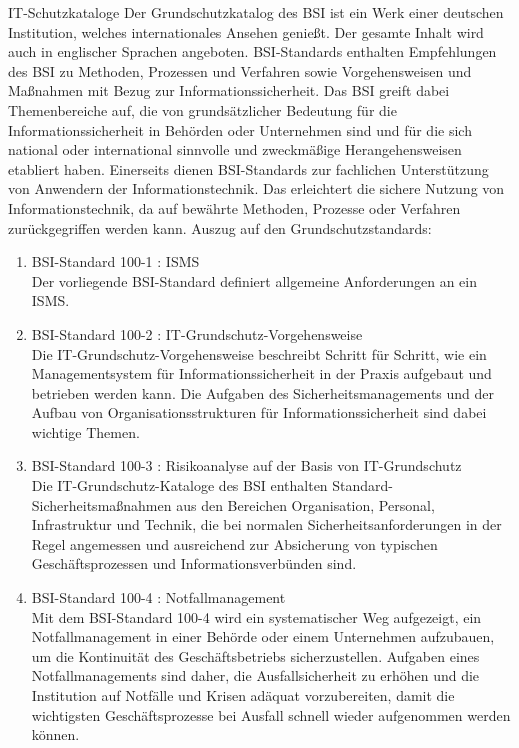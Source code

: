  \label{IT-Schutzkataloge}
 \begin{section}{IT-Schutzkataloge}
	Der Grundschutzkatalog des BSI ist ein Werk einer deutschen Institution, welches 
	internationales Ansehen genießt. Der gesamte Inhalt wird auch in englischer Sprachen 
	angeboten.
	BSI-Standards enthalten Empfehlungen des BSI zu Methoden, Prozessen und Verfahren sowie Vorgehensweisen 
	und Maßnahmen mit Bezug zur Informationssicherheit. 
	Das BSI greift dabei Themenbereiche auf, die von grundsätzlicher Bedeutung für die 
	Informationssicherheit in Behörden oder Unternehmen sind und für die sich national oder 
	international sinnvolle und zweckmäßige Herangehensweisen etabliert haben.
	Einerseits dienen BSI-Standards zur fachlichen Unterstützung von Anwendern der Informationstechnik. 
	Das erleichtert die sichere Nutzung von Informationstechnik, da auf bewährte Methoden, Prozesse 
	oder Verfahren zurückgegriffen werden kann.
  \cite{BSIITkat}  
  Auszug auf den Grundschutzstandards:
  \begin{enumerate}
	\item BSI-Standard 100-1 \cite{BSIGSStd}: \ac{ISMS} \\
		Der vorliegende BSI-Standard definiert allgemeine Anforderungen an ein ISMS.
	\item BSI-Standard 100-2 \cite{BSIGSStd}: IT-Grundschutz-Vorgehensweise \\
		Die IT-Grundschutz-Vorgehensweise beschreibt Schritt für Schritt, 
		wie ein Managementsystem für Informationssicherheit in der Praxis aufgebaut 
		und betrieben werden kann. Die Aufgaben des Sicherheitsmanagements und 
		der Aufbau von Organisationsstrukturen für Informationssicherheit sind dabei wichtige Themen.
	\item BSI-Standard 100-3 \cite{BSIGSStd}: Risikoanalyse auf der Basis von IT-Grundschutz \\
		Die IT-Grundschutz-Kataloge des BSI enthalten Standard-Sicherheitsmaßnahmen 
		aus den Bereichen Organisation, Personal, Infrastruktur und Technik, 
		die bei normalen Sicherheitsanforderungen in der Regel angemessen und 
		ausreichend zur Absicherung von typischen Geschäftsprozessen und Informationsverbünden sind.
	\item BSI-Standard 100-4 \cite{BSIGSStd}: Notfallmanagement \\
		Mit dem BSI-Standard 100-4 wird ein systematischer Weg aufgezeigt, 
		ein Notfallmanagement in einer Behörde oder einem Unternehmen aufzubauen, 
		um die Kontinuität des Geschäftsbetriebs sicherzustellen. Aufgaben eines Notfallmanagements sind daher, 
		die Ausfallsicherheit zu erhöhen und die Institution auf Notfälle und Krisen adäquat vorzubereiten, 
		damit die wichtigsten Geschäftsprozesse bei Ausfall schnell wieder aufgenommen werden können.
  \end{enumerate}
 \end{section}
 
